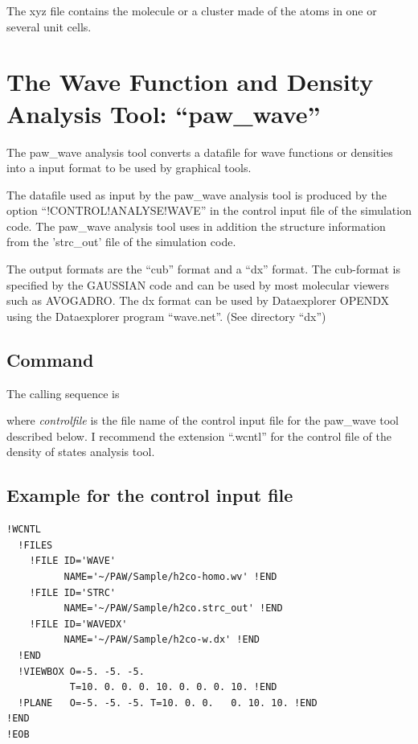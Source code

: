 \documentclass[final,12pt,makeidx,DIV=calc]{article}
\begin{document}
{{{{{{The xyz file contains the molecule or a cluster made of the atoms in
one or several unit cells.


\newpage
\section{The Wave Function and Density Analysis Tool: ``paw\_wave''}
The paw\_wave analysis tool converts a datafile for wave functions or
densities into a input format to be used by graphical tools. 

The datafile used as input by the paw\_wave analysis tool is produced
by the option ``!CONTROL!ANALYSE!WAVE'' in the control input file of
the simulation code. The paw\_wave analysis tool uses in addition 
the structure information from  the 'strc\_out' file of the simulation code.

The output formats are the ``cub'' format and a ``dx'' format.  The
cub-format is specified by the GAUSSIAN code and can be used by most
molecular viewers such as AVOGADRO. The dx format can be used by
Dataexplorer OPENDX \cite{opendx} using the Dataexplorer program
``wave.net''. (See directory ``dx'')

\subsection{Command}

The calling sequence is

\bigskip{}\bigskip

\noindent 
where {\it controlfile} is the file name of the control input file for
the paw\_wave tool described below. I recommend the extension
``.wcntl'' for the control file of the density of states analysis tool.

\subsection{Example for the control input file}

\begin{verbatim}
!WCNTL
  !FILES
    !FILE ID='WAVE' 
          NAME='~/PAW/Sample/h2co-homo.wv' !END
    !FILE ID='STRC' 
          NAME='~/PAW/Sample/h2co.strc_out' !END
    !FILE ID='WAVEDX' 
          NAME='~/PAW/Sample/h2co-w.dx' !END
  !END
  !VIEWBOX O=-5. -5. -5. 
           T=10. 0. 0. 0. 10. 0. 0. 0. 10. !END
  !PLANE   O=-5. -5. -5. T=10. 0. 0.   0. 10. 10. !END
!END
!EOB
\end{verbatim}

}}}}}}
\end{document}
